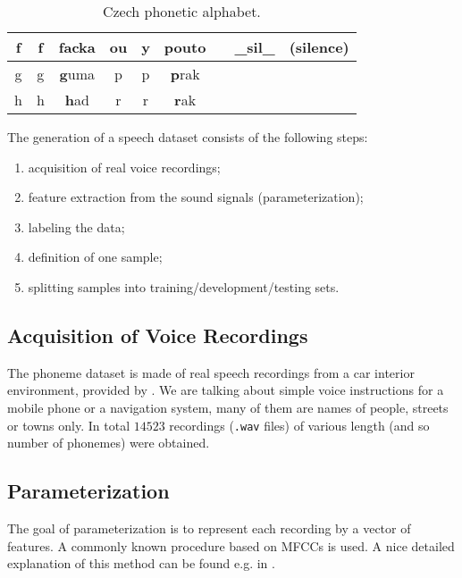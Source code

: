 \begin{table}[H]
{\begin{tabular}{|c|c|c||c|c|c||c|c|c|}
f  & f                & \textbf{f}acka            & ou & y                & p\textbf{ou}to            &       & \_sil\_          & (silence)                 \\ \hline
g  & g                & \textbf{g}uma             & p  & p                & \textbf{p}rak             &       &                  &                           \\ \hline
h  & h                & \textbf{h}ad              & r  & r                & \textbf{r}ak              &       &                  &                           \\ \hline
\end{tabular}}
\caption{Czech phonetic alphabet.}
\label{tab:methods:phonetic_alphabet}
\end{table}

The generation of a speech dataset consists of the following steps:

\begin{enumerate}
\item acquisition of real voice recordings;
\item feature extraction from the sound signals (parameterization);
\item labeling the data;
\item definition of one sample;
\item splitting samples into training/development/testing sets.
\end{enumerate}

\subsection*{Acquisition of Voice Recordings}
The phoneme dataset is made of real speech recordings from a car interior environment, provided by \citep{online:skoda}. We are talking about simple voice instructions for a mobile phone or a navigation system, many of them are names of people, streets or towns only. In total $ 14523 $ recordings (\texttt{.wav} files) of various length (and so number of phonemes) were obtained.

\subsection*{Parameterization}
The goal of parameterization is to represent each recording by a vector of features. A commonly known procedure based on MFCCs is used. A nice detailed explanation of this method can be found e.g. in \citep{online:mfcc}. 

